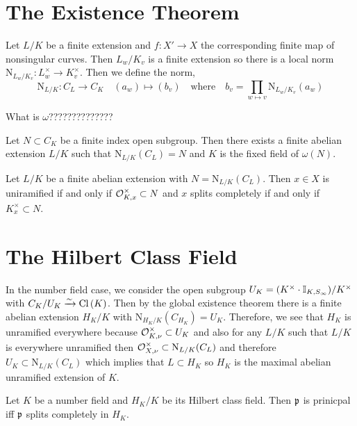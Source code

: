 \documentclass[12pt]{article}
\begin{document}
\section{The Existence Theorem}

\newcommand{\Nm}{\mathrm{N}}

\begin{defn}
Let $L/K$ be a finite extension and $f : X' \to X$ the corresponding finite map of nonsingular curves. Then $L_{w} / K_{v}$ is a finite extension so there is a local norm $\Nm_{L_{w}/K_{v}} : L_{w}^\times \to K_{v}^\times$. Then we define the norm,
\[ \Nm_{L/K} : C_L \to C_K \quad (a_w) \mapsto (b_v) \quad \text{where} \quad b_v = \prod_{w \mapsto v} \Nm_{L_{w}/K_{v}}(a_w) \]
\end{defn}

\begin{defn}
What is $\omega$??????????????
\end{defn}

\begin{thm}
Let $N \subset C_K$ be a finite index open subgroup. Then there exists a finite abelian extension $L/K$ such that $\Nm_{L/K}(C_L) = N$ and $K$ is the fixed field of $\omega(N)$.
\end{thm}

\begin{thm}
Let $L/K$ be a finite abelian extension with $N = \Nm_{L/K}(C_L)$. Then $x \in X$ is uniramified if and only if $\mathcal{O}_{K, x}^\times \subset N$ and $x$ splits completely if and only if $K_x^\times \subset N$.
\end{thm}

\section{The Hilbert Class Field}

In the number field case, we consider the open subgroup $U_K = (K^\times \cdot \mathbb{I}_{K, S_\infty})/K^\times$ with $C_K / U_K \xrightarrow{\sim} \mathrm{Cl} \left( K \right)$. Then by the global existence theorem there is a finite abelian extension $H_K / K$ with $\Nm_{H_K/K}(C_{H_K}) = U_K$. Therefore, we see that $H_K$ is unramified everywhere because $\mathcal{O}_{K, \nu}^\times \subset U_K$ and also for any $L / K$ such that $L/K$ is everywhere unramified then $\stalk{X}{\nu}^\times \subset \Nm_{L/K}(C_L)$ and therefore $U_K \subset \Nm_{L/K}(C_L)$ which implies that $L \subset H_K$ so $H_K$ is the maximal abelian unramified extension of $K$. 

\begin{prop}
Let $K$ be a number field and $H_K / K$ be its Hilbert class field. Then $\mathfrak{p}$ is prinicpal iff $\mathfrak{p}$ splits completely in $H_K$.
\end{prop}
\end{document}
